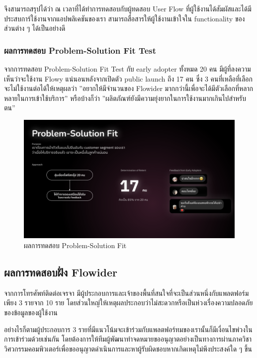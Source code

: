 จึงสามารถสรุปได้ว่า ณ เวลาที่ได้ทำการทดสอบกับผู้ทดสอบ  User Flow ที่ผู้ใช้งานได้สัมผัสและได้มีประสบการ์ใช้งานจากแอปพลิเคชันของเรา สามารถสื่อสารให้ผู้ใช้งานเข้าใจใน functionality ของส่วนต่าง ๆ ได้เป็นอย่างดี

\subsubsection{ผลการทดสอบ Problem-Solution Fit Test}
จากการทดสอบ Problem-Solution Fit Test กับ early adopter ทั้งหมด 20 คน มีผู้ที่ลงความเห็นว่าจะใช้งาน Flowy แน่นอนหลังจากเปิดตัว public launch ถึง 17 คน ซึ่ง 3 คนที่เหลือที่เลือกจะไม่ใช้งานต่อได้ให้เหตุผลว่า ''อยากให้มีจำนวนของ Flowider มากกว่านี้เพื่อจะได้มีตัวเลือกที่หลากหลายในการเข้าใช้บริการ'' หรือบ้างก็ว่า ''ผลิตภัณฑ์ยังมีความยุ่งยากในการใช้งานมากเกินไปสำหรับตน''
\begin{figure}[h]
    \begin{center}
    \includegraphics[width=\linewidth]{./image/Problem-Solution_Fit.png}
    \end{center}
    \caption[Problem-Solution Fit]{ผลการทดสอบ Problem-Solution Fit}
    \label{fig:Problem-Solution_Fit}
\end{figure}

\subsection{ผลการทดสอบฝั่ง Flowider}
จากการโทรศัพท์ติดต่อเจรจา มีผู้ประกอบการและเจ้าของพื้นที่สนใจที่จะเป็นส่วนหนึ่งกับแพลตฟอร์มเพียง 3 รายจาก 10 ราย โดยส่วนใหญ่ให้เหตุผลประกอบว่าไม่สะดวกหรือเป็นห่วงเรื่องความปลอดภัยของข้อมูลของผู้ใช้งาน

อย่างไรก็ตามผู้ประกอบการ 3 รายที่มีแนวโน้มจะเข้าร่วมกับแพลตฟอร์ทมของเรานั้นก็มีเงื่อนไขพ่วงในการเข้าร่วมด้วยเช่นกัน โดยต้องการให้ทีมผู้พัฒนาทำจดหมายขออนุญาตอย่างเป็นทางการผ่านภาควิชาวิศวกรรมคอมพิวเตอร์เพื่อขออนุญาตดำเนินการและหาผู้รับผิดชอบหากเกิดเหตุไม่พึงประสงค์ใด ๆ ขึ้น

